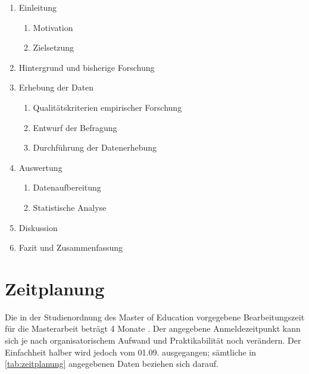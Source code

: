 \documentclass[11pt, a4paper]{article}
\begin{document}
\begin{enumerate}
	\item Einleitung
	\begin{enumerate}[label*=\arabic*.]
		\item Motivation
		\item Zielsetzung
	\end{enumerate}
	\item Hintergrund und bisherige Forschung \label{bisherige-forschung}
	\item Erhebung der Daten \label{datenerhebung}
	\begin{enumerate}[label*=\arabic*.]
		\item Qualitätskriterien empirischer Forschung
		\item Entwurf der Befragung
		\item Durchführung der Datenerhebung
	\end{enumerate}
	\item Auswertung \label{auswertung}
	\begin{enumerate}[label*=\arabic*.]
		\item Datenaufbereitung
		\item Statistische Analyse
	\end{enumerate}
	\item Diskussion
	\item Fazit und Zusammenfassung
\end{enumerate}


\section{Zeitplanung}

Die in der Studienordnung des Master of Education vorgegebene Bearbeitungszeit für die Masterarbeit beträgt 4 Monate \cite[\S19.3]{unifreiburg2018studien}.
Der angegebene Anmeldezeitpunkt kann sich je nach organisatorischem Aufwand und Praktikabilität noch verändern.
Der Einfachheit halber wird jedoch vom 01.09. ausgegangen; sämtliche in \autoref{tab:zeitplanung} angegebenen Daten beziehen sich darauf.
\end{document}
